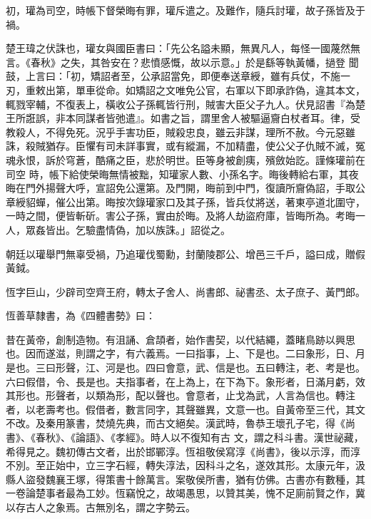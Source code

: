 \begin{pinyinscope}
 初，瓘為司空，時帳下督榮晦有罪，瓘斥遣之。及難作，隨兵討瓘，故子孫皆及于禍。



 楚王瑋之伏誅也，瓘女與國臣書曰：「先公名謚未顯，無異凡人，每怪一國蔑然無言。《春秋》之失，其咎安在？悲憤感慨，故以示意。」於是繇等執黃幡，撾登
 聞鼓，上言曰：「初，矯詔者至，公承詔當免，即便奉送章綬，雖有兵仗，不施一刃，重敕出第，單車從命。如矯詔之文唯免公官，右軍以下即承詐偽，違其本文，輒戮宰輔，不復表上，橫收公子孫輒皆行刑，賊害大臣父子九人。伏見詔書『為楚王所誑誤，非本同謀者皆弛遣』。如書之旨，謂里舍人被驅逼齎白杖者耳。律，受教殺人，不得免死。況乎手害功臣，賊殺忠良，雖云非謀，理所不赦。今元惡雖誅，殺賊猶存。臣懼有司未詳事實，或有縱漏，不加精盡，使公父子仇賊不滅，冤魂永恨，訴於穹蒼，酷痛之臣，悲於明世。臣等身被創痍，殯斂始訖。謹條瓘前在司空
 時，帳下給使榮晦無情被黜，知瓘家人數、小孫名字。晦後轉給右軍，其夜晦在門外揚聲大呼，宣詔免公還第。及門開，晦前到中門，復讀所齎偽詔，手取公章綬貂蟬，催公出第。晦按次錄瓘家口及其子孫，皆兵仗將送，著東亭道北圍守，一時之間，便皆斬斫。害公子孫，實由於晦。及將人劫盜府庫，皆晦所為。考晦一人，眾姦皆出。乞驗盡情偽，加以族誅。」詔從之。



 朝廷以瓘舉門無辜受禍，乃追瓘伐蜀勳，封蘭陵郡公、增邑三千戶，謚曰成，贈假黃鉞。



 恆字巨山，少辟司空齊王府，轉太子舍人、尚書郎、祕書丞、太子庶子、黃門郎。



 恆善草隸書，為《四體書勢》曰：



 昔在黃帝，創制造物。有沮誦、倉頡者，始作書契，以代結繩，蓋睹鳥跡以興思也。因而遂滋，則謂之字，有六義焉。一曰指事，上、下是也。二曰象形，日、月是也。三曰形聲，江、河是也。四曰會意，武、信是也。五曰轉注，老、考是也。六曰假借，令、長是也。夫指事者，在上為上，在下為下。象形者，日滿月虧，效其形也。形聲者，以類為形，配以聲也。會意者，止戈為武，人言為信也。轉注者，以老壽考也。假借者，數言同字，其聲雖異，文意一也。自黃帝至三代，其文不改。及秦用篆書，焚燒先典，而古文絕矣。漢武時，魯恭王壞孔子宅，得《尚書》、《春秋》、《論語》、《孝經》。時人以不復知有古
 文，謂之科斗書。漢世祕藏，希得見之。魏初傳古文者，出於邯鄲淳。恆祖敬侯寫淳《尚書》，後以示淳，而淳不別。至正始中，立三字石經，轉失淳法，因科斗之名，遂效其形。太康元年，汲縣人盜發魏襄王塚，得策書十餘萬言。案敬侯所書，猶有仿佛。古書亦有數種，其一卷論楚事者最為工妙。恆竊悅之，故竭愚思，以贊其美，愧不足廁前賢之作，冀以存古人之象焉。古無別名，謂之字勢云。




\end{pinyinscope}
